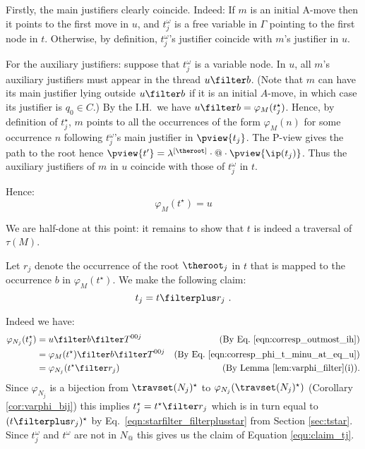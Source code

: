 \begin{enumerate}[$\bullet$]
\begin{enumerate}
\begin{itemize}
Firstly, the main justifiers clearly coincide. Indeed:
If $m$ is an initial A-move then it points to the first move in $u$, and $t_j^\omega$ is a free variable in $\Gamma$ pointing to the first node in $t$. Otherwise, by definition, $t_j^\omega$'s justifier coincide with $m$'s justifier in $u$.

For the auxiliary justifiers: suppose that $t_j^\omega$ is a variable node.
In $u$, all $m$'s auxiliary justifiers must appear in the thread $u\filter b$.
(Note that $m$ can have its main justifier lying outside $u\filter b$ if it is an initial $A$-move, in which case its justifier is $q_0 \in C$.)
By the I.H.\ we have $u\filter b = \varphi_M(t_j^\star)$. Hence, by definition of $t_j^\star$, $m$ points to
all the occurrences of the form $\varphi_M(n)$ for some occurrence $n$ following $t_j^\omega$'s main justifier in $\pview{t_j}$.
The P-view gives the path to the root hence $\pview{t'} = \lambda^{[\theroot]} \cdot @ \cdot \pview{\ip(t_j)}$.
Thus the auxiliary justifiers of $m$ in $u$ coincide with those of $t_j^\omega$ in $t$.

Hence:
        \begin{equation}
                \varphi_M(t^\star) =  u  \label{eqn:corresp_phi_t_minu_at_eq_u}
        \end{equation}
\smallskip

        We are half-done at this point: it remains to show that $t$ is indeed a traversal of $\tau(M)$.

        Let $r_j$ denote the occurrence of the root
        $\theroot_j$ in $t$ that is mapped to the
        occurrence $b$ in $\varphi_{M}(t^\star)$. We make the following claim:
        \begin{equation}
            t_j = t \filterplus r_j \ . \label{equ:claim_tj}
        \end{equation}

        Indeed we have:
        \begin{align*}
        \varphi_{N_j}(t_j^\star) &= u \filter b \filter T^{00j}
            & \mbox{(By Eq.\ \ref{eqn:corresp_outmost_ih})} \\
         &= \varphi_{M}(t^\star) \filter b \filter T^{00j}
            & \mbox{(By Eq.\ \ref{eqn:corresp_phi_t_minu_at_eq_u})} \\
         &= \varphi_{N_j}(t^\star \filter r_j )
            & \mbox{(By Lemma \ref{lem:varphi_filter}(i)).}
        \end{align*}
        Since $\varphi_{N_j}$ is a bijection from
        $\travset(N_j)^\star$ to $\varphi_{N_j}(
        \travset(N_j)^\star )$ (Corollary
        \ref{cor:varphi_bij}) this implies
        $t_j^\star = t^\star \filter r_j$ which is in turn equal to
         $(t\filterplus r_j)^\star$ by Eq.\ \ref{eqn:starfilter_filterplusstar} from Section
        \ref{sec:tstar}. Since $t_j^\omega$ and $t^\omega$ are not in $N_@$ this gives us
        the claim of Equation \ref{equ:claim_tj}.
    \smallskip


\end{itemize}
\end{enumerate}
\end{enumerate}
